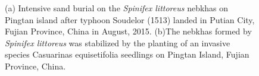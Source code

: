 \documentclass[]{interact}
\theoremstyle{plain}%
\theoremstyle{definition}
\theoremstyle{remark}
\begin{document}
\begin{figure}
  \centering
  \hspace{5pt}
  \caption{(a) Intensive sand burial on the \textit{Spinifex littoreus} nebkhas on Pingtan island after typhoon Soudelor (1513) landed in Putian City, Fujian Province, China in August, 2015. (b)The nebkhas formed by \textit{Spinifex littoreus} was stabilized by the planting of an invasive species Casuarinas equisetifolia seedlings on Pingtan Island, Fujian Province, China.} 
  \label{fig:sample-pic}
\end{figure}
\end{document}
